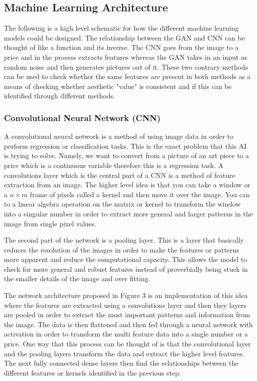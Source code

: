 \documentclass{article}
\begin{document}
\subsection{Machine Learning Architecture}

The following is a high level schematic for how the different machine learning models could be designed. The relationship between the GAN and CNN can be thought of like a function and its inverse. The CNN goes from the image to a price and in the process extracts features whereas the GAN takes in an input as random noise and then generates pictures out of it. These two contrary methods can be used to check whether the same features are present in both methods as a means of checking whether aesthetic "value" is consistent and if this can be identified through different methods. 

\subsubsection{Convolutional Neural Network (CNN)}

A convolutional neural network is a method of using image data in order to perform regression or classification tasks. This is the exact problem that this AI is trying to solve. Namely, we want to convert from a picture of an art piece to a price which is a continuous variable therefore this is a regression task. A convolutions layer which is the central part of a CNN is a method of feature extraction from an image. The higher level idea is that you can take a window or a $n \times m$ frame of pixels called a kernel and then move it over the image. You can to a linear algebra operation on the matrix or kernel to transform the window into a singular number in order to extract more general and larger patterns in the image from single pixel values. \newline

The second part of the network is a pooling layer. This is a layer that basically reduces the resolution of the images in order to make the features or patterns more apparent and reduce the computational capacity. This allows the model to check for more general and robust features instead of proverbially being stuck in the smaller details of the image and over fitting. \newline

The network architecture proposed in Figure 3 is an implementation of this idea where the features are extracted using a convolutions layer and then they layers are pooled in order to extract the most important patterns and information from the image. The data is then flattened and then fed through a neural network with activation in order to transform the multi feature data into a single number or a price. One way that this process can be thought of is that the convolutional layer and the pooling layers transform the data and extract the higher level features. The next fully connected dense layers then find the relationships between the different features or kernels identified in the previous step. \newline
\end{document}

